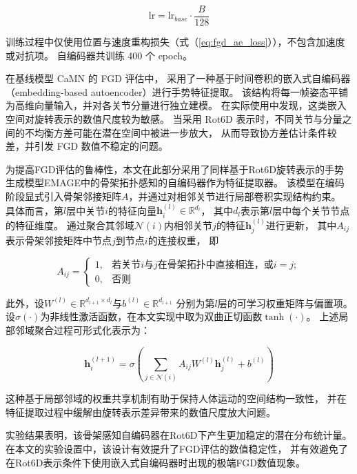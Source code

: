 \begin{equation}
\mathrm{lr}=\mathrm{lr}_{base}\cdot \frac{B}{128}
\end{equation}

训练过程中仅使用位置与速度重构损失（式（\ref{eq:fgd_ae_loss}）），不包含加速度或对抗项。
自编码器共训练 400 个 epoch。

在基线模型 CaMN 的 FGD 评估中，
采用了一种基于时间卷积的嵌入式自编码器（embedding-based autoencoder）进行手势特征提取。
该结构将每一帧姿态平铺为高维向量输入，并对各关节分量进行独立建模。
在实际使用中发现，这类嵌入空间对旋转表示的数值尺度较为敏感。
当采用 Rot6D 表示时，不同关节与分量之间的不均衡方差可能在潜在空间中被进一步放大，
从而导致协方差估计条件较差，并引发 FGD 数值不稳定的问题。

为提高FGD评估的鲁棒性，本文在此部分采用了同样基于Rot6D旋转表示的手势生成模型EMAGE\cite{emage}中的骨架拓扑感知的自编码器作为特征提取器。
该模型在编码阶段显式引入骨架邻接矩阵$A$，并通过对相邻关节进行局部卷积实现结构约束。
具体而言，第$l$层中关节$i$的特征向量$\mathbf{h}_i^{(l)} \in \mathbb{R}^{d_l}$，
其中$d_l$表示第$l$层中每个关节节点的特征维度。
通过聚合其邻域$\mathcal{N}(i)$内相邻关节$j$的特征$\mathbf{h}_j^{(l)}$进行更新，
其中$A_{ij}$表示骨架邻接矩阵中节点$j$到节点$i$的连接权重，
即

\begin{equation}
A_{ij} =
\begin{cases}
1, & \text{若关节}i\text{与}j\text{在骨架拓扑中直接相连，或}i=j; \\
0, & \text{否则}
\end{cases}
\end{equation}

此外，设$W^{(l)} \in \mathbb{R}^{d_{l+1}\times d_l}$与$b^{(l)} \in \mathbb{R}^{d_{l+1}}$
分别为第$l$层的可学习权重矩阵与偏置项。设$\sigma(\cdot)$为非线性激活函数，在本文实现中取为双曲正切函数$\tanh(\cdot)$。
上述局部邻域聚合过程可形式化表示为：

\begin{equation}
\mathbf{h}_i^{(l+1)} =
\sigma\left(
\sum_{j \in \mathcal{N}(i)} A_{ij} W^{(l)} \mathbf{h}_j^{(l)} + b^{(l)}
\right)
\end{equation}

这种基于局部邻域的权重共享机制有助于保持人体运动的空间结构一致性，
并在特征提取过程中缓解由旋转表示差异带来的数值尺度放大问题。

实验结果表明，该骨架感知自编码器在Rot6D下产生更加稳定的潜在分布统计量。
在本文的实验设置中，该设计有效提升了FGD评估的数值稳定性，
并有效避免了在Rot6D表示条件下使用嵌入式自编码器时出现的极端FGD数值现象。

